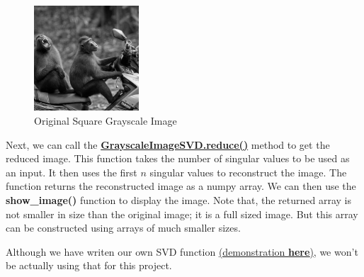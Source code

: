 	\begin{figure}[H]
		\centering
		\includegraphics[width=0.35\textwidth]{../static/monkey/monkey.jpg}
		\caption{Original Square Grayscale Image}
		\label{fig:g_monkey_orig}
	\end{figure}

	Next, we can call the \href{https://github.com/PeithonKing/comp_phys_P346/blob/main/library/DIY.py#L55-L59}{\textbf{GrayscaleImageSVD.reduce()}} method to get the reduced image. This function takes the number of singular values to be used as an input. It then uses the first $n$ singular values to reconstruct the image. The function returns the reconstructed image as a numpy array. We can then use the \textbf{show\_image()} function to display the image. Note that, the returned array is not smaller in size than the original image; it is a full sized image. But this array can be constructed using arrays of much smaller sizes.

	Although we have writen our own SVD function \href{google.com}{(demonstration \textbf{here})}, we won't be actually using that for this project.

	\begin{center}
		\noindent{}
	\end{center}

